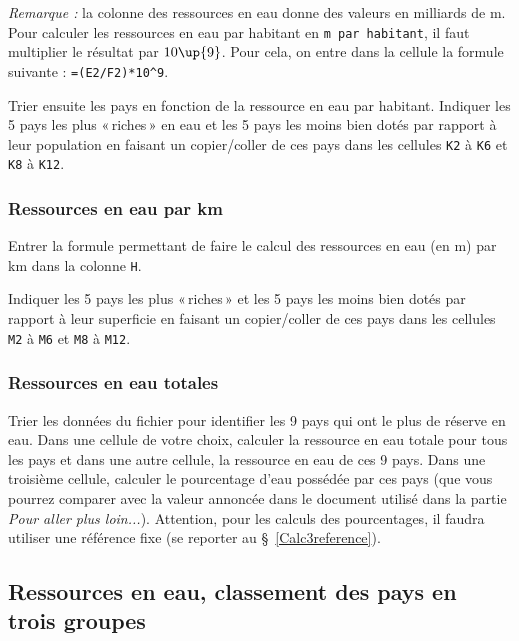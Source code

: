 \emph{Remarque :} la colonne des ressources en eau donne des valeurs en milliards de m. Pour calculer les ressources en eau par habitant en \texttt{m par habitant}, il faut multiplier le résultat par $10\up{9}$. Pour cela, on entre dans la cellule la formule suivante : \texttt{=(E2/F2)*10}\texttt{\^}\texttt{9}.

Trier ensuite les pays en fonction de la ressource en eau par habitant. Indiquer les 5 pays les plus «\,riches\,» en eau et les 5 pays les moins bien dotés par rapport à leur population en faisant un copier/coller de ces pays dans les cellules \texttt{K2} à \texttt{K6} et \texttt{K8} à \texttt{K12}.

\subsubsection{Ressources en eau par km}

Entrer la formule permettant de faire le calcul des ressources en eau (en m) par km dans la colonne \texttt{H}.

Indiquer les 5 pays les plus «\,riches\,» et les 5 pays les moins bien dotés par rapport à leur superficie en faisant un copier/coller de ces pays dans les cellules \texttt{M2} à \texttt{M6} et \texttt{M8} à \texttt{M12}.


\subsubsection{Ressources en eau totales}

Trier les données du fichier pour identifier les 9 pays qui ont le plus de réserve en eau. Dans une cellule de votre choix, calculer la ressource en eau totale pour tous les pays et dans une autre cellule, la ressource en eau de ces 9 pays. Dans une troisième cellule, calculer le pourcentage d'eau possédée par ces pays (que vous pourrez comparer avec la valeur annoncée dans le document utilisé dans la partie \emph{Pour aller plus loin...}). Attention, pour les calculs des pourcentages, il faudra utiliser une référence fixe (se reporter au \S\ \vref{Calc3reference}).

\subsection{Ressources en eau, classement des pays en trois groupes}

